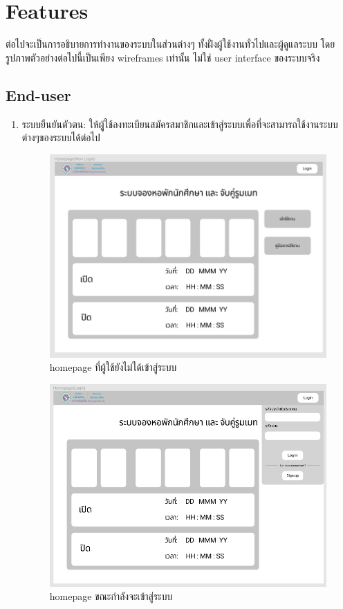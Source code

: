 \section{Features}
ต่อไปจะเป็นการอธิบายการทำงานของระบบในส่วนต่างๆ ทั้งฝั่งผู้ใช้งานทั่วไปและผู้ดูแลระบบ โดยรูปภาพตัวอย่างต่อไปนี้เป็นเพียง wireframes เท่านั้น ไม่ใช่ user interface ของระบบจริง
\subsection{End-user}
\begin{enumerate}
\item ระบบยืนยันตัวตน: ให้ผูู้ใช้ลงทะเบียนสมัครสมาชิกและเข้าสู่ระบบเพื่อที่จะสามารถใช้งานระบบต่างๆของระบบได้ต่อไป
\begin{figure}[h]
\begin{center}
\includegraphics[width=\linewidth]{photo/homepageNoAuth.png}
\end{center}
\caption{homepage ที่ผู้ใช้ยังไม่ได้เข้าสู่ระบบ}
\label{fig:hp-no-auth}
\end{figure}

  \begin{figure}[h]
  \begin{center}
  \includegraphics[width=\linewidth]{photo/homepageLogin.png}
  \end{center}
  \caption{homepage ขณะกำลังจะเข้าสู่ระบบ}
  \label{fig:hp-login}
  \end{figure}


\end{enumerate}
